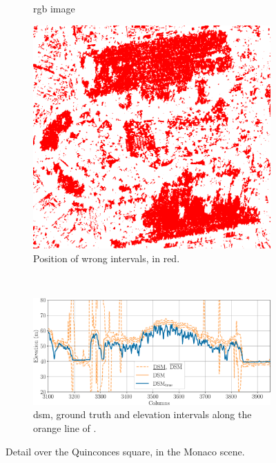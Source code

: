 \begin{figure}
\begin{subfigure}[t]{0.33\linewidth}
        \caption{\acrshort{rgb} image}
        \label{fig:Bordeaux_RGB}
    \end{subfigure}\hfill
    \begin{subfigure}[t]{0.33\linewidth}
        \flushright
        \includegraphics[width=\linewidth]{Images/Chap_6/Bordeaux_error_zoom.png}
        \caption{Position of wrong intervals, in red.}
        \label{fig:Bordeaux_wrong_intervals}
    \end{subfigure}\\
    \begin{subfigure}[t]{\linewidth}
        \flushright
        \includegraphics[width=\linewidth]{Images/Chap_6/Bordeaux_row_600.png}
        \caption{\acrshort{dsm}, ground truth and elevation intervals along the orange line of .}
        \label{fig:Bordeaux_row}
    \end{subfigure}
    \caption{Detail over the Quinconces square, in the Monaco scene.}
    \label{fig:Bordeaux_zoom}
\end{figure}


